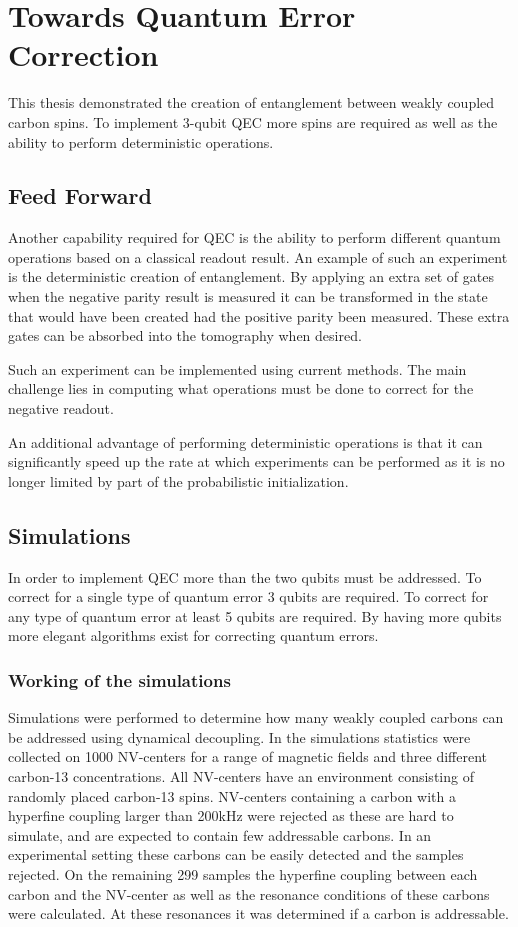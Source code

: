 \chapter{Towards Quantum Error Correction}
This thesis demonstrated the creation of entanglement between weakly coupled carbon spins.
To implement 3-qubit QEC more spins are required as well as the ability to perform deterministic operations.

\section{Feed Forward}
Another capability required for QEC is the ability to perform different quantum operations based on a classical readout result.
An example of such an experiment is the deterministic creation of entanglement.
By applying an extra set of gates when the negative parity result is measured it can be transformed in the state that would have been created had the positive parity been measured.
These extra gates can be absorbed into the tomography when desired.

Such an experiment can be implemented using current methods.
The main challenge lies in computing what operations must be done to correct for the negative readout.

An additional advantage of performing deterministic operations is that it can significantly speed up the rate at which experiments can be performed as it is no longer limited by part of the probabilistic initialization.


\section{Simulations}
In order to implement QEC more than the two qubits must be addressed.
To correct for a single type of quantum error 3 qubits are required.
To correct for any type of quantum error at least 5 qubits are required.
By having more qubits more elegant algorithms exist for correcting quantum errors.

\subsection{Working of the simulations}
Simulations were performed to determine how many weakly coupled carbons can be addressed using dynamical decoupling.
In the simulations statistics were collected on 1000 NV-centers for a range of magnetic fields and three different carbon-13 concentrations.
All NV-centers have an environment consisting of randomly placed carbon-13 spins.
NV-centers containing a carbon with a hyperfine coupling larger than 200kHz were rejected as these are hard to simulate, and are expected to contain few addressable carbons.
In an experimental setting these carbons can be easily detected and the samples rejected.
On the remaining 299 samples the hyperfine coupling between each carbon and the NV-center as well as the resonance conditions of these carbons were calculated.
At these resonances it was determined if a carbon is addressable.

